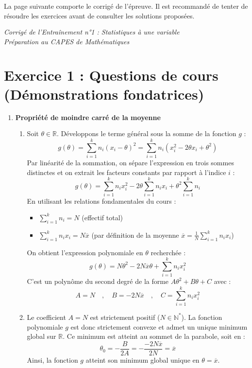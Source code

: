 \documentclass[11pt,a4paper]{article}
\begin{document}
\newpage
\noindent La page suivante comporte le corrigé de l'épreuve. Il est recommandé de tenter de résoudre les exercices avant de consulter les solutions proposées.

\newpage


\begin{center}
\textit{Corrigé de l'Entraînement n°1 : Statistiques à une variable\\\large Préparation au CAPES de Mathématiques}
\end{center}


\section*{Exercice 1 : Questions de cours (Démonstrations fondatrices)}

\begin{enumerate}
    \item \textbf{Propriété de moindre carré de la moyenne}
    \begin{enumerate}
        \item Soit $\theta \in \mathbb{R}$. Développons le terme général sous la somme de la fonction $g$ :
        \[ g(\theta) = \sum_{i=1}^{k} n_{i}(x_{i}-\theta)^{2} = \sum_{i=1}^{k} n_{i}(x_{i}^{2} - 2\theta x_{i} + \theta^{2}) \]
        Par linéarité de la sommation, on sépare l'expression en trois sommes distinctes et on extrait les facteurs constants par rapport à l'indice $i$ :
        \[ g(\theta) = \sum_{i=1}^{k} n_{i}x_{i}^{2} - 2\theta \sum_{i=1}^{k} n_{i}x_{i} + \theta^{2} \sum_{i=1}^{k} n_{i} \]
        En utilisant les relations fondamentales du cours :
        \begin{itemize}
            \item $\sum_{i=1}^{k} n_{i} = N$ (effectif total)
            \item $\sum_{i=1}^{k} n_{i}x_{i} = N\overline{x}$ (par définition de la moyenne $\overline{x} = \frac{1}{N}\sum_{i=1}^{k}n_ix_i$)
        \end{itemize}
        On obtient l'expression polynomiale en $\theta$ recherchée :
        \[ g(\theta) = N\theta^{2} - 2N\overline{x}\theta + \sum_{i=1}^{k} n_{i}x_{i}^{2} \]
        C'est un polynôme du second degré de la forme $A\theta^2 + B\theta + C$ avec :
        \[ A = N \quad , \quad B = -2N\overline{x} \quad , \quad C = \sum_{i=1}^{k} n_{i}x_{i}^{2} \]
        
        \item Le coefficient $A = N$ est strictement positif ($N \in \mathbb{N}^*$). La fonction polynomiale $g$ est donc strictement convexe et admet un unique minimum global sur $\mathbb{R}$.
        Ce minimum est atteint au sommet de la parabole, soit en :
        \[ \theta_0 = -\frac{B}{2A} = -\frac{-2N\overline{x}}{2N} = \overline{x} \]
        Ainsi, la fonction $g$ atteint son minimum global unique en $\theta = \overline{x}$.
        

\end{enumerate}
\end{enumerate}
\end{document}
